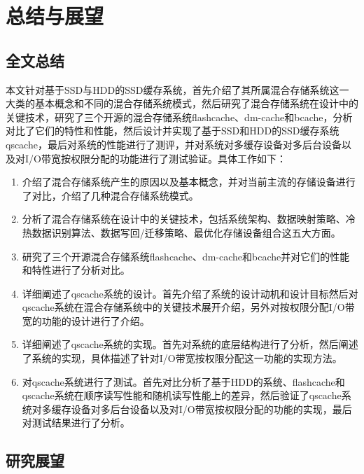 

\chapter{总结与展望}
\label{chap:summary}

\section{全文总结}

本文针对基于SSD与HDD的SSD缓存系统，首先介绍了其所属混合存储系统这一大类的基本概念和不同的混合存储系统模式，然后研究了混合存储系统在设计中的关键技术，研究了三个开源的混合存储系统flashcache、dm-cache和bcache，分析对比了它们的特性和性能，然后设计并实现了基于SSD和HDD的SSD缓存系统qscache，最后对系统的性能进行了测评，并对系统对多缓存设备对多后台设备以及对I/O带宽按权限分配的功能进行了测试验证。具体工作如下：

\begin{enumerate}[wide]
    \item 介绍了混合存储系统产生的原因以及基本概念，并对当前主流的存储设备进行了对比，介绍了几种混合存储系统模式。
    \item 分析了混合存储系统在设计中的关键技术，包括系统架构、数据映射策略、冷热数据识别算法、数据写回/迁移策略、最优化存储设备组合这五大方面。
    \item 研究了三个开源混合存储系统flashcache、dm-cache和bcache并对它们的性能和特性进行了分析对比。
    \item 详细阐述了qscache系统的设计。首先介绍了系统的设计动机和设计目标然后对qscache系统在混合存储系统中的关键技术展开介绍，另外对按权限分配I/O带宽的功能的设计进行了介绍。
    \item 详细阐述了qscache系统的实现。首先对系统的底层结构进行了分析，然后阐述了系统的实现，具体描述了针对I/O带宽按权限分配这一功能的实现方法。
    \item 对qscache系统进行了测试。首先对比分析了基于HDD的系统、flashcache和qscache系统在顺序读写性能和随机读写性能上的差异，然后验证了qscache系统对多缓存设备对多后台设备以及对I/O带宽按权限分配的功能的实现，最后对测试结果进行了分析。
\end{enumerate}

\section{研究展望}

